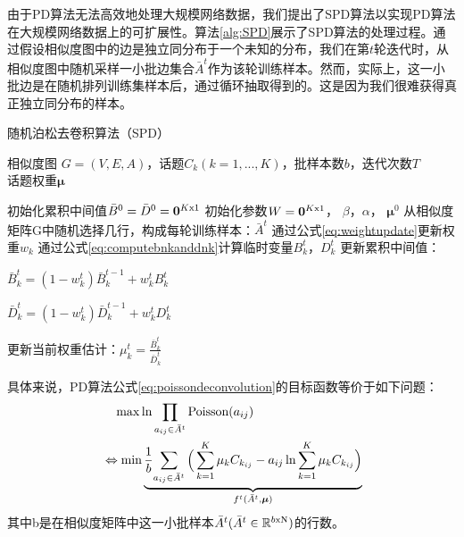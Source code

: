 由于PD算法无法高效地处理大规模网络数据，我们提出了SPD算法以实现PD算法在大规模网络数据上的可扩展性。算法\ref{alg:SPD}展示了SPD算法的处理过程。通过假设相似度图中的边是独立同分布于一个未知的分布，我们在第$t$轮迭代时，从相似度图中随机采样一小批边集合$\bar{A}^t$作为该轮训练样本。然而，实际上，这一小批边是在随机排列训练集样本后，通过循环抽取得到的。这是因为我们很难获得真正独立同分布的样本。
\begin{algorithm}[!htbp]
    \caption{随机泊松去卷积算法（SPD）}\label{alg:SPD}
    \hspace*{0.02in}{\bf Input:}
    相似度图 $G=(V,E,A)$，话题$C_k(k=1,...,K)$，批样本数$b$，迭代次数$T$\\
    \hspace*{0.02in}{\bf Output:}
    话题权重$\bm{\mu}$
    \begin{algorithmic}
        \State 初始化累积中间值$\bar{B}^0=\bar{D}^0=\bm{0}^{K\rm x 1}$
        \State 初始化参数$W=\bm{0}^{K\rm x 1}$， $\beta$，$\alpha$， $\bm{\mu}^0$
        \State 从相似度矩阵G中随机选择几行，构成每轮训练样本：$\bar{A}^t$
        \State 通过公式\eqref{eq:weightupdate}更新权重$w_k$
        \State 通过公式\eqref{eq:computebnkanddnk}计算临时变量$B^t_k$，$D^t_k$
        \State 更新累积中间值：
			\begin{center}$\bar{B}^t_k = (1-w^t_k)\bar{B}^{t-1}_k + w^t_kB^t_k$\end{center}
            \begin{center}$\bar{D}^t_k = (1-w^t_k)\bar{D}^{t-1}_k + w^t_kD^t_k$\end{center}
        \State 更新当前权重估计：$\mu^t_k = \frac{\bar{B}^t_k}{\bar{D}^t_k}$
        \EndFor
    \end{algorithmic}
\end{algorithm}

具体来说，PD算法公式\eqref{eq:poissondeconvolution}的目标函数等价于如下问题：
\begin{align} \label{eq:objectivefunction}
  &\quad\max{\ln \prod_{a_{ij} \in \bar{A}^t}\text{Poisson}(a_{ij})}  \notag\\
  &\Leftrightarrow\min \underbrace{\frac{1}{b}{\sum_{a_{ij} \in \bar{A}^t} \Big(\sum_{k=1}^{K}\mu_k C_{k_{ij}} - a_{ij}\ln \sum_{k=1}^{K}\mu_k C_{k_{ij}}\Big)}}_{f^t(\bar{A}^t,\bm{\mu})}
\end{align}
其中b是在相似度矩阵中这一小批样本$\bar{A}^t(\bar{A}^t\in \mathbb{R}^{b \rm x N})$的行数。

